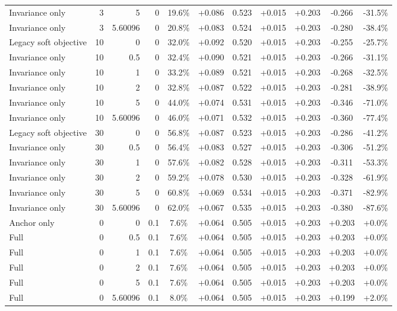 \begin{table}[htbp]
\begin{tabular}{lrrrccccccc}
Invariance only & 3 & 5 & 0 & 19.6\% & +0.086 & 0.523 & +0.015 & +0.203 & -0.266 & -31.5\% \\
Invariance only & 3 & 5.60096 & 0 & 20.8\% & +0.083 & 0.524 & +0.015 & +0.203 & -0.280 & -38.4\% \\
Legacy soft objective & 10 & 0 & 0 & 32.0\% & +0.092 & 0.520 & +0.015 & +0.203 & -0.255 & -25.7\% \\
Invariance only & 10 & 0.5 & 0 & 32.4\% & +0.090 & 0.521 & +0.015 & +0.203 & -0.266 & -31.1\% \\
Invariance only & 10 & 1 & 0 & 33.2\% & +0.089 & 0.521 & +0.015 & +0.203 & -0.268 & -32.5\% \\
Invariance only & 10 & 2 & 0 & 32.8\% & +0.087 & 0.522 & +0.015 & +0.203 & -0.281 & -38.9\% \\
Invariance only & 10 & 5 & 0 & 44.0\% & +0.074 & 0.531 & +0.015 & +0.203 & -0.346 & -71.0\% \\
Invariance only & 10 & 5.60096 & 0 & 46.0\% & +0.071 & 0.532 & +0.015 & +0.203 & -0.360 & -77.4\% \\
Legacy soft objective & 30 & 0 & 0 & 56.8\% & +0.087 & 0.523 & +0.015 & +0.203 & -0.286 & -41.2\% \\
Invariance only & 30 & 0.5 & 0 & 56.4\% & +0.083 & 0.527 & +0.015 & +0.203 & -0.306 & -51.2\% \\
Invariance only & 30 & 1 & 0 & 57.6\% & +0.082 & 0.528 & +0.015 & +0.203 & -0.311 & -53.3\% \\
Invariance only & 30 & 2 & 0 & 59.2\% & +0.078 & 0.530 & +0.015 & +0.203 & -0.328 & -61.9\% \\
Invariance only & 30 & 5 & 0 & 60.8\% & +0.069 & 0.534 & +0.015 & +0.203 & -0.371 & -82.9\% \\
Invariance only & 30 & 5.60096 & 0 & 62.0\% & +0.067 & 0.535 & +0.015 & +0.203 & -0.380 & -87.6\% \\
Anchor only & 0 & 0 & 0.1 & 7.6\% & +0.064 & 0.505 & +0.015 & +0.203 & +0.203 & +0.0\% \\
Full & 0 & 0.5 & 0.1 & 7.6\% & +0.064 & 0.505 & +0.015 & +0.203 & +0.203 & +0.0\% \\
Full & 0 & 1 & 0.1 & 7.6\% & +0.064 & 0.505 & +0.015 & +0.203 & +0.203 & +0.0\% \\
Full & 0 & 2 & 0.1 & 7.6\% & +0.064 & 0.505 & +0.015 & +0.203 & +0.203 & +0.0\% \\
Full & 0 & 5 & 0.1 & 7.6\% & +0.064 & 0.505 & +0.015 & +0.203 & +0.203 & +0.0\% \\
Full & 0 & 5.60096 & 0.1 & 8.0\% & +0.064 & 0.505 & +0.015 & +0.203 & +0.199 & +2.0\% \\

\end{tabular}
\end{table}
